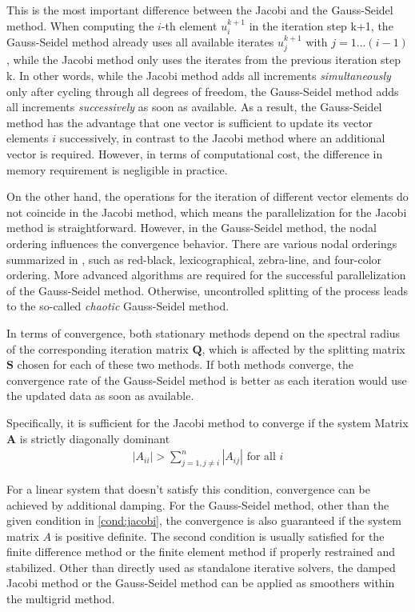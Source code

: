 This is the most important difference between the Jacobi and the Gauss-Seidel method. When computing the $i$-th element $u_i^{k+1}$ in the iteration step k+1, the Gauss-Seidel method already uses all available iterates $u_j^{k+1}$ with $j=1\dots(i-1)$, while the Jacobi method only uses the iterates from the previous iteration step k. In other words, while the Jacobi method adds all increments \textit{simultaneously} only after cycling through all degrees of freedom, the Gauss-Seidel method adds all increments \textit{successively} as soon as available. As a result, the Gauss-Seidel method has the advantage that one vector is sufficient to update its vector elements $i$ successively, in contrast to the Jacobi method where an additional vector is required. However, in terms of computational cost, the difference in memory requirement is negligible in practice. 

On the other hand, the operations for the iteration of different vector elements do not coincide in the Jacobi method, which means the parallelization for the Jacobi method is straightforward. However, in the Gauss-Seidel method, the nodal ordering influences the convergence behavior. There are various nodal orderings summarized in \citep{hackbusch2013multi}, such as red-black, lexicographical, zebra-line, and four-color ordering. More advanced algorithms are required for the successful parallelization of the Gauss-Seidel method. Otherwise, uncontrolled splitting of the process leads to the so-called \textit{chaotic} Gauss-Seidel method.  

In terms of convergence, both stationary methods depend on the spectral radius of the corresponding iteration matrix $\boldsymbol{Q}$, which is affected by the splitting matrix $\boldsymbol{S}$ chosen for each of these two methods. If both methods converge, the convergence rate of the Gauss-Seidel method is better as each iteration would use the updated data as soon as available. 

Specifically, it is sufficient for the Jacobi method to converge if the system Matrix $\boldsymbol{A}$ is strictly diagonally dominant 
\citep{https://doi.org/10.1002/zamm.19940740205}
\begin{align}
    |A_{ii}| > \sum_{j=1,j\neq i}^{n}|A_{ij}| \text{ for all }i
    \label{cond:jacobi}
\end{align}

For a linear system that doesn't satisfy this condition, convergence can be achieved by additional damping. For the Gauss-Seidel method, other than the given condition in \autoref{cond:jacobi}, the convergence is also guaranteed if the system matrix $A$ is positive definite. The second condition is usually satisfied for the finite difference method or the finite element method if properly restrained and stabilized. \citep{bathe2006finite} Other than directly used as standalone iterative solvers, the damped Jacobi method or the Gauss-Seidel method can be applied as smoothers within the multigrid method.

